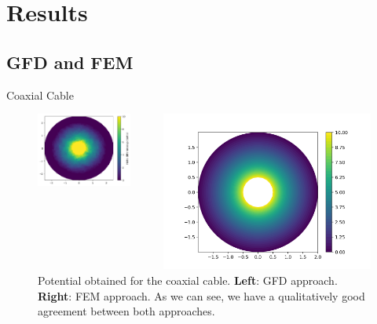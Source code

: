 \documentclass{beamer}
\begin{document}
\section{Results}

\subsection{GFD and FEM}

\begin{frame}{Coaxial Cable}
\begin{figure}[h]
\begin{columns}
    \begin{column}{0.5\linewidth}
        \centering\includegraphics[width=0.85\textwidth]{Figures/Coax_GFDM.png}
    \end{column}
    \begin{column}{0.5\linewidth}
        \centering\includegraphics[width=1.0\textwidth]{Figures/PotentialFieldFEMCoaxial.png}
    \end{column}
\end{columns}
\caption{
Potential obtained for the coaxial cable. \textbf{Left}: GFD approach. \textbf{Right}: FEM approach. As we can see, we have a qualitatively good agreement between both approaches.}
\label{fig:tCoaxial_Cable_VField}
\end{figure}
\end{frame}
\end{document}
